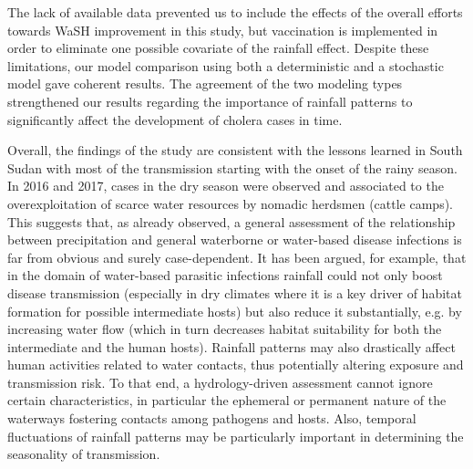 The lack of available data prevented us to include the effects of the overall efforts towards WaSH improvement in this study, but vaccination is implemented in order to eliminate one possible covariate of the rainfall effect. 
Despite these limitations, our model comparison using both a deterministic and a stochastic model gave coherent results. The agreement of the two modeling types strengthened our results regarding the importance of rainfall patterns to significantly affect the development of cholera cases in time.

Overall, the findings of the study are consistent with the lessons learned in South Sudan with most of the transmission starting with the onset of the rainy season. In 2016 and 2017, cases in the dry season were observed and associated to the overexploitation of scarce water resources by nomadic herdsmen (cattle camps). This suggests that, as already observed, a general assessment of the relationship between precipitation and general waterborne or water-based disease infections is far from obvious and surely case-dependent. It has been argued, for example, that in the domain of water-based parasitic infections rainfall could not only boost disease transmission (especially in dry climates where it is a key driver of habitat formation for possible intermediate hosts) but also reduce it substantially\cite[-12\baselineskip]{McCreesh:ChallengesPredictingEffects:2013}, e.g. by increasing water flow (which in turn decreases habitat suitability for both the intermediate and the human hosts). Rainfall patterns may also drastically affect human activities related to water contacts, thus potentially altering exposure and transmission risk\cite{Lai:SpatialDistributionSchistosomiasis:2015}. To that end, a hydrology-driven assessment cannot ignore certain characteristics, in particular the ephemeral or permanent nature of the waterways fostering contacts among pathogens and hosts\cite{Perez-Saez:HydrologyDensityFeedbacks:2016}. Also, temporal fluctuations of rainfall patterns may be particularly important in determining the seasonality of transmission\cite{Bertuzzo:HydroclimatologyDualpeakAnnual:2012,Bertuzzo:PredictionSpatialEvolution:2011,McCreesh:PredictingEffectsClimate:2015,Perez-Saez:HydrologyDensityFeedbacks:2016}.



